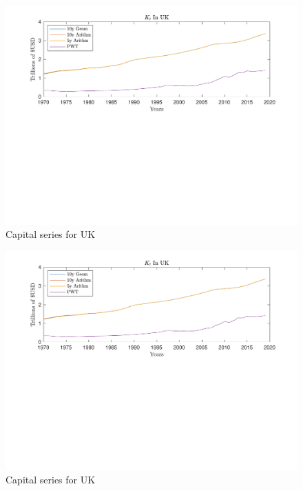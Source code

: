 \documentclass[11pt]{article}
\theoremstyle{mytheoremstyle}
\theoremstyle{mytheoremstyle}
\theoremstyle{myproblemstyle}
\begin{document}
\begin{figure}
    \includegraphics[trim = 0in 3.2in 0in 0in, clip, width=1\textwidth]{out/Capital_Series_PWT_UK.pdf}
    \caption{Capital series for UK}
\end{figure}

\begin{figure}[]
    \includegraphics[trim = 0in 3.2in 0in 0in, clip, width=1\textwidth]{out/Capital_Series_PWT_UK.pdf}
    \caption{Capital series for UK}
\end{figure}
\end{document}
